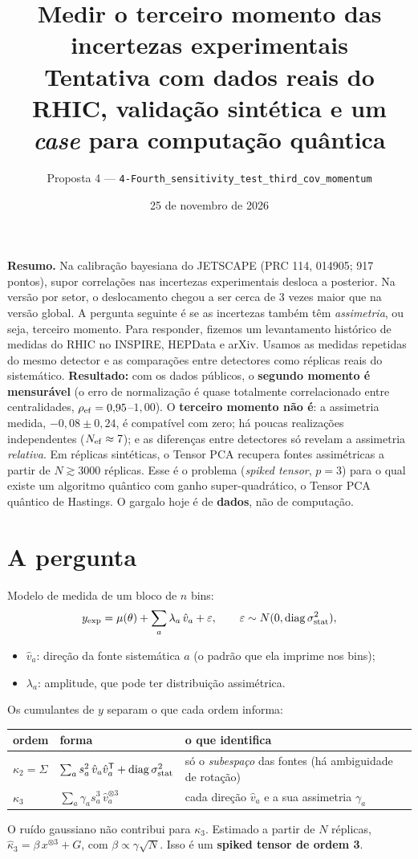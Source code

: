 \documentclass[11pt,a4paper]{article}
\title{Medir o terceiro momento das incertezas experimentais\\
\large Tentativa com dados reais do RHIC, validação sintética e um \emph{case} para computação quântica}
\date{25 de novembro de 2026}
\author{Proposta 4 --- \texttt{4-Fourth\_sensitivity\_test\_third\_cov\_momentum}}
\newcommand{\vhat}{\hat v}
\newcommand{\kthree}{\kappa_3}
\newcommand{\caixa}[2]{\par\noindent\colorbox{#1}{\parbox{\dimexpr\linewidth-2\fboxsep}{#2}}\par}
\begin{document}
\maketitle
\vspace{-1.5em}

\caixa{blue!6}{\textbf{Resumo.} Na calibração bayesiana do JETSCAPE (PRC 114, 014905; 917 pontos), supor correlações nas incertezas
experimentais desloca a posterior. Na versão por setor, o deslocamento chegou a ser cerca de 3 vezes maior que na versão global.
A pergunta seguinte é se as incertezas também têm \emph{assimetria}, ou seja, terceiro momento. Para responder, fizemos um levantamento
histórico de medidas do RHIC no INSPIRE, HEPData e arXiv. Usamos as medidas repetidas do mesmo detector e as comparações entre
detectores como réplicas reais do sistemático.
\textbf{Resultado:} com os dados públicos, o \textbf{segundo momento é mensurável} (o erro de normalização é quase totalmente correlacionado
entre centralidades, $\rho_{\rm ef}=0{,}95$--$1{,}00$). O \textbf{terceiro momento não é}: a assimetria medida, $-0{,}08\pm0{,}24$, é compatível
com zero; há poucas realizações independentes ($N_{\rm ef}\approx7$); e as diferenças entre detectores só revelam a assimetria \emph{relativa}.
Em réplicas sintéticas, o Tensor PCA recupera fontes assimétricas a partir de $N\gtrsim3000$ réplicas. Esse é o problema
(\emph{spiked tensor}, $p=3$) para o qual existe um algoritmo quântico com ganho super-quadrático, o Tensor PCA quântico de Hastings.
O gargalo hoje é de \textbf{dados}, não de computação.}

\section{A pergunta}
Modelo de medida de um bloco de $n$ bins:
\[
y_{\rm exp}=\mu(\theta)+\sum_{a}\lambda_a\,\vhat_a+\varepsilon,\qquad \varepsilon\sim N(0,\mathrm{diag}\,\sigma^2_{\rm stat}),
\]
\begin{itemize}[nosep]
\item $\vhat_a$: direção da fonte sistemática $a$ (o padrão que ela imprime nos bins);
\item $\lambda_a$: amplitude, que pode ter distribuição assimétrica.
\end{itemize}
Os cumulantes de $y$ separam o que cada ordem informa:
\begin{center}
\begin{tabular}{@{}lll@{}}
\toprule
ordem & forma & o que identifica \\
\midrule
$\kappa_2=\Sigma$ & $\sum_a s_a^2\,\vhat_a\vhat_a^{\mathsf T}+\mathrm{diag}\,\sigma^2_{\rm stat}$ & só o \emph{subespaço} das fontes (há ambiguidade de rotação) \\
$\kthree$ & $\sum_a \gamma_a s_a^3\,\vhat_a^{\otimes3}$ & cada direção $\vhat_a$ e a sua assimetria $\gamma_a$ \\
\bottomrule
\end{tabular}
\end{center}
O ruído gaussiano não contribui para $\kthree$. Estimado a partir de $N$ réplicas, $\hat\kappa_3=\beta\,x^{\otimes3}+G$, com $\beta\propto\gamma\sqrt N$.
Isso é um \textbf{spiked tensor de ordem 3}.
\end{document}
